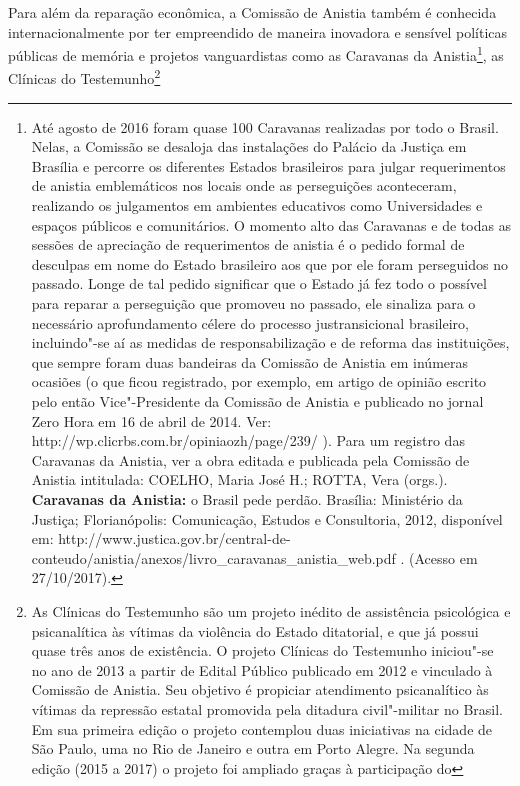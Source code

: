 Para além da reparação econômica, a Comissão de Anistia também é
conhecida internacionalmente por ter empreendido de maneira inovadora e
sensível políticas públicas de memória e projetos vanguardistas como as
Caravanas da Anistia\footnote{Até agosto de 2016 foram quase 100
  Caravanas realizadas por todo o Brasil. Nelas, a Comissão se desaloja
  das instalações do Palácio da Justiça em Brasília e percorre os
  diferentes Estados brasileiros para julgar requerimentos de anistia
  emblemáticos nos locais onde as perseguições aconteceram, realizando
  os julgamentos em ambientes educativos como Universidades e espaços
  públicos e comunitários. O momento alto das Caravanas e de todas as
  sessões de apreciação de requerimentos de anistia é o pedido formal de
  desculpas em nome do Estado brasileiro aos que por ele foram
  perseguidos no passado. Longe de tal pedido significar que o Estado já
  fez todo o possível para reparar a perseguição que promoveu no
  passado, ele sinaliza para o necessário aprofundamento célere do
  processo justransicional brasileiro, incluindo"-se aí as medidas de
  responsabilização e de reforma das instituições, que sempre foram duas
  bandeiras da Comissão de Anistia em inúmeras ocasiões (o que ficou
  registrado, por exemplo, em artigo de opinião escrito pelo então
  Vice"-Presidente da Comissão de Anistia e publicado no jornal Zero Hora
  em 16 de abril de 2014. Ver:
  http://wp.clicrbs.com.br/opiniaozh/page/239/ ). Para um registro das
  Caravanas da Anistia, ver a obra editada e publicada pela Comissão de
  Anistia intitulada: COELHO, Maria José H.; ROTTA, Vera (orgs.).
  \textbf{Caravanas da Anistia:} o Brasil pede perdão. Brasília:
  Ministério da Justiça; Florianópolis: Comunicação, Estudos e
  Consultoria, 2012, disponível em:
  http://www.justica.gov.br/central-de-conteudo/anistia/anexos/livro\_caravanas\_anistia\_web.pdf
  . (Acesso em 27/10/2017).}, as Clínicas do Testemunho\footnote{As
  Clínicas do Testemunho são um projeto inédito de assistência
  psicológica e psicanalítica às vítimas da violência do Estado
  ditatorial, e que já possui quase três anos de existência. O projeto
  Clínicas do Testemunho iniciou"-se no ano de 2013 a partir de Edital
  Público publicado em 2012 e vinculado à Comissão de Anistia. Seu
  objetivo é propiciar atendimento psicanalítico às vítimas da repressão
  estatal promovida pela ditadura civil"-militar no Brasil. Em sua
  primeira edição o projeto contemplou duas iniciativas na cidade de São
  Paulo, uma no Rio de Janeiro e outra em Porto Alegre. Na segunda
  edição (2015 a 2017) o projeto foi ampliado graças à participação do
}
